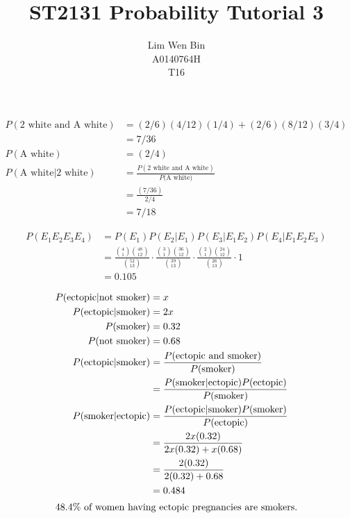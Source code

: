\documentclass[12pt]{article}
\newenvironment{problem}[2][Problem]{\begin{trivlist}
\item[\hskip \labelsep {\bfseries #1}\hskip \labelsep {\bfseries #2.}]}{\end{trivlist}}
\begin{document}
\title{ST2131 Probability Tutorial 3}
\author{Lim Wen Bin \\
A0140764H\\
T16}
\maketitle

\begin{problem}{1}
\end{problem}
\begin{align*}
	P(\text{2 white and A white}) &= (2/6)(4/12)(1/4) + (2/6)(8/12)(3/4)\\ 
	&= 7/36 \\ 
	P(\text{A white}) &= (2/4)\\
	P(\text{A white$|$2 white}) &= \frac{P(\text{2 white and A white})}
		{P\text{(A white)}}\\
	&= \frac{(7/36)}{2/4}\\ 
	&= 7/18 
\end{align*}
\filbreak

\begin{problem}{2}
\end{problem}
\begin{align*}
	P(E_1E_2E_3E_4) &= P(E_1) P(E_2|E_1) P(E_3|E_1E_2)
		P(E_4|E_1E_2E_3) \\
	&= \frac{\binom{4}{1} \binom{48}{12}} {\binom{52}{13}} 
		\cdot \frac{\binom{3}{1} \binom{36}{12}} {\binom{39}{13}} 
		\cdot \frac{\binom{2}{1} \binom{24}{12}} {\binom{26}{13}} 
		\cdot 1 \\
	&= 0.105
\end{align*}
\filbreak

\begin{problem}{3}
\end{problem}
\begin{align*}
	P(\text{ectopic$|$not smoker}) &= x \\
	P(\text{ectopic$|$smoker}) &= 2x \\
	P(\text{smoker}) &= 0.32 \\
	P(\text{not smoker}) &= 0.68 \\
	P(\text{ectopic$|$smoker}) &= \frac{P(\text{ectopic and smoker})} 
		{P(\text{smoker})} \\
	&= \frac{P(\text{smoker$|$ectopic}) P(\text{ectopic}) } 
		{P(\text{smoker})} \\
	P(\text{smoker$|$ectopic}) &= 
		\frac{P(\text{ectopic$|$smoker}) {P(\text{smoker})}}
		{P(\text{ectopic}) } \\
	&= \frac{2x(0.32)} {2x(0.32) + x(0.68)} \\
	&= \frac{2(0.32)} {2(0.32) + 0.68} \\
	&= 0.484\\
	\intertext{$48.4\%$ of women having ectopic pregnancies are smokers.}
\end{align*}
\filbreak
\end{document}
